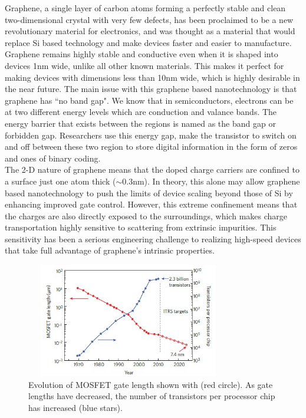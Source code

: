 \documentclass[conference]{IEEEtran}
\begin{document}
Graphene, a single layer of carbon atoms forming a perfectly stable and clean two-dimensional crystal with very few defects, has been proclaimed to be a new revolutionary material for electronics, and was thought as a material that would replace Si based technology and make devices faster and easier to manufacture. Graphene remains highly stable and conductive even when it is shaped into devices 1nm wide, unlike all other known materials. This makes it perfect for making devices with dimensions less than 10nm wide, which is highly desirable in the near future. The main issue with this graphene based nanotechnology is that graphene has ``no band gap". We know that in semiconductors, electrons can be at two different energy levels which are conduction and valance bands. The energy barrier that exists between the regions is named as the band gap or forbidden gap. Researchers use this energy gap, make the transistor to switch on and off between these two region to store digital information in the form of zeros and ones of binary coding.
\\

The 2-D nature of graphene means that the doped charge carriers are confined to a surface just one atom thick (\(\sim\)0.3nm). In theory, this alone may allow graphene based nanotechnology to push the limits of device scaling beyond those of Si by enhancing improved gate control. However, this extreme confinement means that the charges are also directly exposed to the surroundings, which makes charge transportation highly sensitive to scattering from extrinsic impurities. This sensitivity has been a serious engineering challenge to realizing high-speed devices that take full advantage of graphene’s intrinsic properties.

\begin{figure}[h]
\centering
\includegraphics[width=9cm, height=5cm]{2.jpg}
\caption{Evolution of MOSFET gate length shown with (red circle). As gate lengths have decreased, the number of transistors per processor chip has increased (blue stars).}
\end{figure}
\end{document}
